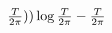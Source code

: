 \documentclass{article}
\begin{document}
\[
\color[rgb]{0.000,0.000,0.000} {
\tfrac{T}{2\pi}))\log\tfrac{T}{2\pi} - \tfrac{T}{2\pi}}
\]
\end{document}
